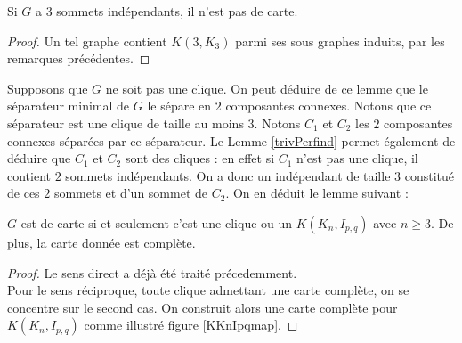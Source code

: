 \documentclass{scrartcl}
\begin{document}
\begin{flushleft}
\begin{lem}\label{trivPerfind}
    Si $G$ a $3$ sommets indépendants, il n'est pas de carte.
\end{lem}

\begin{proof}
    Un tel graphe contient $K(3, K_3)$ parmi ses sous graphes induits, par les remarques précédentes.
\end{proof}

Supposons que $G$ ne soit pas une clique.
On peut déduire de ce lemme que le séparateur minimal de $G$ le sépare en $2$ composantes connexes. Notons que ce séparateur est une
clique de taille au moins $3$. Notons $C_1$ et $C_2$ les $2$ composantes connexes séparées par ce séparateur. Le Lemme
\ref{trivPerfind} permet également de déduire que $C_1$ et $C_2$ sont des cliques : en effet si $C_1$ n'est pas une clique,
il contient $2$ sommets indépendants. On a donc un indépendant de taille $3$ constitué de ces $2$ sommets et d'un sommet de $C_2$.
On en déduit le lemme suivant :

\begin{lem}\label{trivPar3conn}
    $G$ est de carte si et seulement c'est une clique ou un $K(K_n, I_{p,q})$ avec $n \geq 3$. De plus, la carte
    donnée est complète.
\end{lem}

\begin{proof}
    Le sens direct a déjà été traité précedemment.\\
    Pour le sens réciproque, toute clique admettant une carte complète, on se concentre sur le second cas. On construit
    alors une carte complète pour $K(K_n, I_{p,q})$ comme illustré figure \ref{KKnIpqmap}.
\end{proof}


\end{flushleft}
\end{document}
